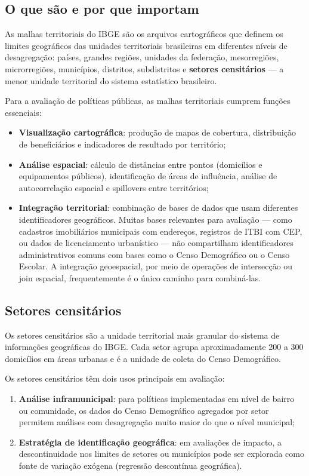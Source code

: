\subsection{O que são e por que importam}

As malhas territoriais do IBGE são os arquivos cartográficos que definem os limites geográficos das unidades territoriais brasileiras em diferentes níveis de desagregação: países, grandes regiões, unidades da federação, mesorregiões, microrregiões, municípios, distritos, subdistritos e \textbf{setores censitários} --- a menor unidade territorial do sistema estatístico brasileiro.

Para a avaliação de políticas públicas, as malhas territoriais cumprem funções essenciais:

\begin{itemize}
  \item \textbf{Visualização cartográfica}: produção de mapas de cobertura, distribuição de beneficiários e indicadores de resultado por território;
  \item \textbf{Análise espacial}: cálculo de distâncias entre pontos (domicílios e equipamentos públicos), identificação de áreas de influência, análise de autocorrelação espacial e spillovers entre territórios;
  \item \textbf{Integração territorial}: combinação de bases de dados que usam diferentes identificadores geográficos. Muitas bases relevantes para avaliação --- como cadastros imobiliários municipais com endereços, registros de ITBI com CEP, ou dados de licenciamento urbanístico --- não compartilham identificadores administrativos comuns com bases como o Censo Demográfico ou o Censo Escolar. A integração geoespacial, por meio de operações de intersecção ou join espacial, frequentemente é o único caminho para combiná-las.
\end{itemize}

\subsection{Setores censitários}

Os setores censitários são a unidade territorial mais granular do sistema de informações geográficas do IBGE. Cada setor agrupa aproximadamente 200 a 300 domicílios em áreas urbanas e é a unidade de coleta do Censo Demográfico.

Os setores censitários têm dois usos principais em avaliação:

\begin{enumerate}
  \item \textbf{Análise inframunicipal}: para políticas implementadas em nível de bairro ou comunidade, os dados do Censo Demográfico agregados por setor permitem análises com desagregação muito maior do que o nível municipal;
  \item \textbf{Estratégia de identificação geográfica}: em avaliações de impacto, a descontinuidade nos limites de setores ou municípios pode ser explorada como fonte de variação exógena (regressão descontínua geográfica).
\end{enumerate}

